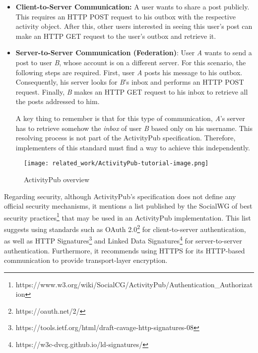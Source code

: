 \begin{itemize}
  \item \textbf{Client-to-Server Communication:} A user wants to share a post publicly. This requires an HTTP POST request to his outbox with the respective activity object. After this, other users interested in seeing this user's post can make an HTTP GET request to the user's outbox and retrieve it.
  \item \textbf{Server-to-Server Communication (Federation)}: User \emph{A} wants to send a post to user \emph{B}, whose account is on a different server. For this scenario, the following steps are required. First, user \emph{A} posts his message to his outbox. Consequently, his server looks for \emph{B}'s inbox and performs an HTTP POST request. Finally, \emph{B} makes an HTTP GET request to his inbox to retrieve all the posts addressed to him.
  
  A key thing to remember is that for this type of communication, \emph{A}'s server has to retrieve somehow the \emph{inbox} of user \emph{B} based only on his username. This resolving process is not part of the ActivityPub specification. Therefore, implementers of this standard must find a way to achieve this independently. 
\end{itemize}
 

\begin{figure}[H]
  \centering
  \texttt{[image: related\_work/ActivityPub-tutorial-image.png]}
  \caption{ActivityPub overview \cite{lemmer-webber_tallon_guy_prodromou_2018}}
  \label{fig:ap_flow}
\end{figure}
\pagebreak

Regarding security, although ActivityPub's specification does not define any official security mechanisms, it mentions a list published by the SocialWG of best security practices\footnote{https://www.w3.org/wiki/SocialCG/ActivityPub/Authentication\_Authorization} that may be used in an ActivityPub implementation. This list suggests using standards such as OAuth 2.0\footnote{https://oauth.net/2/} for client-to-server authentication, as well as HTTP Signatures\footnote{https://tools.ietf.org/html/draft-cavage-http-signatures-08} and Linked Data Signatures\footnote{https://w3c-dvcg.github.io/ld-signatures/} for server-to-server authentication. Furthermore, it recommends using HTTPS for its HTTP-based communication to provide transport-layer encryption.


